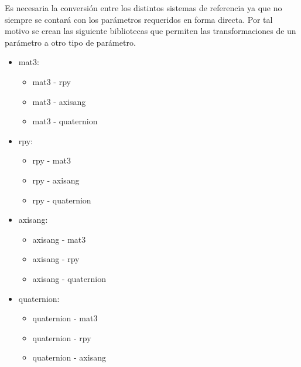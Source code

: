 \documentclass[main.tex]{subfiles}
\begin{document}
Es necesaria la conversión entre los distintos sistemas
de referencia ya que no siempre se contará con los
parámetros requeridos en forma directa. Por tal motivo
se crean las siguiente bibliotecas que permiten las
transformaciones de un parámetro a otro tipo de parámetro.

\begin{itemize}
\item mat3:
  \begin{itemize}
  \item mat3 - rpy
  \item mat3 - axisang
  \item mat3 - quaternion
  \end{itemize}
\item rpy:
  \begin{itemize}
  \item rpy - mat3
  \item rpy - axisang
  \item rpy - quaternion
  \end{itemize}
\item axisang:
  \begin{itemize}
  \item axisang - mat3
  \item axisang - rpy
  \item axisang - quaternion
  \end{itemize}
\item quaternion:
  \begin{itemize}
  \item quaternion - mat3
  \item quaternion - rpy
  \item quaternion - axisang
  \end{itemize}
\end{itemize}
\end{document}

